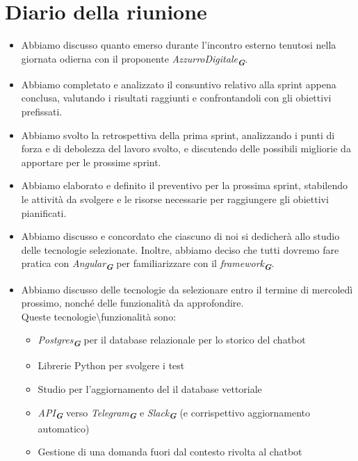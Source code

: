 
\section{Diario della riunione}

\begin{itemize}
    \item Abbiamo discusso quanto emerso durante l'incontro esterno tenutosi nella giornata odierna con il proponente \emph{AzzurroDigitale}\textsubscript{\textit{\textbf{G}}}.
    \item Abbiamo completato e analizzato il consuntivo relativo alla sprint appena conclusa, valutando i risultati raggiunti e confrontandoli con gli obiettivi prefissati.
    \item Abbiamo svolto la retrospettiva della prima sprint, analizzando i punti di forza e di debolezza del lavoro svolto, e discutendo delle possibili migliorie da apportare per le prossime sprint.
    \item Abbiamo elaborato e definito il preventivo per la prossima sprint, stabilendo le attività da svolgere e le risorse necessarie per raggiungere gli obiettivi pianificati.
    \item Abbiamo discusso e concordato che ciascuno di noi si dedicherà allo studio delle tecnologie selezionate. Inoltre, abbiamo deciso che tutti dovremo fare pratica con \emph{Angular}\textsubscript{\textit{\textbf{G}}} per familiarizzare con il \emph{framework}\textsubscript{\textit{\textbf{G}}}.
    \item Abbiamo discusso delle tecnologie da selezionare entro il termine di mercoledì prossimo, nonché delle funzionalità da approfondire. \\    
    Queste tecnologie\textbackslash funzionalità sono:
    \begin{itemize}
        \item \emph{Postgres}\textsubscript{\textit{\textbf{G}}} per il database relazionale per lo storico del chatbot
        \item Librerie Python per svolgere i test
        \item Studio per l'aggiornamento del il database vettoriale
        \item \emph{API}\textsubscript{\textit{\textbf{G}}} verso \emph{Telegram}\textsubscript{\textit{\textbf{G}}} e \emph{Slack}\textsubscript{\textit{\textbf{G}}} (e corrispettivo aggiornamento automatico)
        \item Gestione di una domanda fuori dal contesto rivolta al chatbot
    \end{itemize}


\end{itemize}
